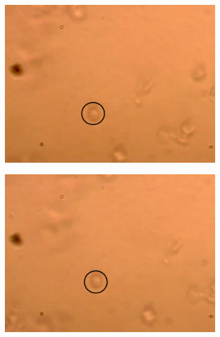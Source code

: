 \documentclass[letterpaper,12pt,oneside]{book}
\begin{document}
\begin{figure}[H] 
  \begin{subfigure}[b]{0.5\linewidth}
    \centering
    \includegraphics[scale=0.3]{Results/ResultsOilpseudonana/op1.png} 
    \caption{}
    \label{fig7:a} 
    \vspace{4ex}
  \end{subfigure}%
  \begin{subfigure}[b]{0.5\linewidth}
    \centering
    \includegraphics[scale=0.3]{Results/ResultsOilpseudonana/op2.png} 
    \caption{}
    \label{fig7:b} 
    \vspace{4ex}
  \end{subfigure} 
  \begin{subfigure}[b]{0.5\linewidth}

\end{subfigure}
\end{figure}
\end{document}
